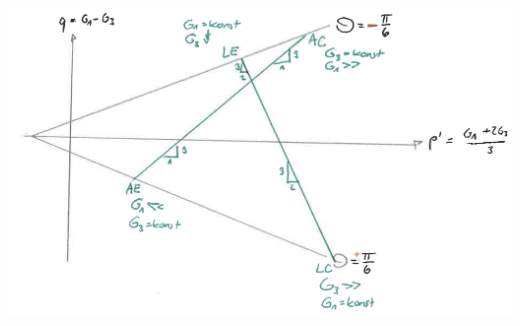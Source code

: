\begin{minipage}{\linewidth}
	\includegraphics[width=0.8\linewidth]{images/MC4triax.PNG}
\end{minipage}
